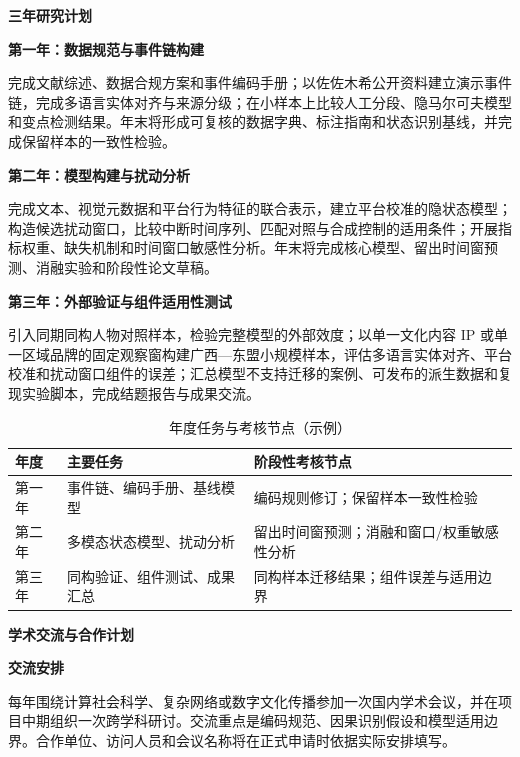 \GXNSFBodyText

\noindent\textbf{三年研究计划}\par

\noindent\textbf{第一年：数据规范与事件链构建}\par
完成文献综述、数据合规方案和事件编码手册；以佐佐木希公开资料建立演示事件链，完成多语言实体对齐与来源分级；在小样本上比较人工分段、隐马尔可夫模型和变点检测结果。年末将形成可复核的数据字典、标注指南和状态识别基线，并完成保留样本的一致性检验。

\noindent\textbf{第二年：模型构建与扰动分析}\par
完成文本、视觉元数据和平台行为特征的联合表示，建立平台校准的隐状态模型；构造候选扰动窗口，比较中断时间序列、匹配对照与合成控制的适用条件；开展指标权重、缺失机制和时间窗口敏感性分析。年末将完成核心模型、留出时间窗预测、消融实验和阶段性论文草稿。

\noindent\textbf{第三年：外部验证与组件适用性测试}\par
引入同期同构人物对照样本，检验完整模型的外部效度；以单一文化内容 IP 或单一区域品牌的固定观察窗构建广西—东盟小规模样本，评估多语言实体对齐、平台校准和扰动窗口组件的误差；汇总模型不支持迁移的案例、可发布的派生数据和复现实验脚本，完成结题报告与成果交流。

\begin{table}[htbp]
  \centering
  \fontsize{10}{14}\selectfont
  \caption{年度任务与考核节点（示例）}
  \begin{tabularx}{\textwidth}{p{}X X}
    \toprule
    年度 & 主要任务 & 阶段性考核节点 \\
    \midrule
    第一年 & 事件链、编码手册、基线模型 & 编码规则修订；保留样本一致性检验 \\
    第二年 & 多模态状态模型、扰动分析 & 留出时间窗预测；消融和窗口/权重敏感性分析 \\
    第三年 & 同构验证、组件测试、成果汇总 & 同构样本迁移结果；组件误差与适用边界 \\
    \bottomrule
  \end{tabularx}
  \label{tab:gx-annual-plan}
\end{table}

\noindent\textbf{学术交流与合作计划}\par

\noindent\textbf{交流安排}\par
每年围绕计算社会科学、复杂网络或数字文化传播参加一次国内学术会议，并在项目中期组织一次跨学科研讨。交流重点是编码规范、因果识别假设和模型适用边界。合作单位、访问人员和会议名称将在正式申请时依据实际安排填写。

